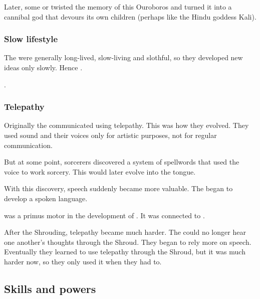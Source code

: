 Later, some  \ophidians or \quiljaaran twisted the memory of this Ouroboros and turned it into a cannibal god that devours its own children (perhaps like the Hindu goddess Kali). 





\subsubsection{Slow lifestyle}
The \ophidians were generally long-lived, slow-living and slothful, so they developed new ideas only slowly. 
Hence .

\Sethicus {}. 





\subsubsection{Telepathy}
Originally the \ophidians{} communicated using telepathy. 
This was how they evolved. 
They used sound and their voices only for artistic purposes, not for regular communication. 

But at some point, \ophidian{} sorcerers discovered a system of spellwords that used the voice to work sorcery. 
This would later evolve into the  tongue. 

With this discovery, speech suddenly became more valuable. 
The \ophidians{} began to develop a spoken language. 

 was a primus motor in the development of \TrueDraconic. 
It was connected to . 

After the Shrouding, telepathy became much harder. 
The \ophidians could no longer hear one another's thoughts through the Shroud. 
They began to rely more on speech. 
Eventually they learned to use telepathy through the Shroud, but it was much harder now, so they only used it when they had to. 









\subsection{Skills and powers}





